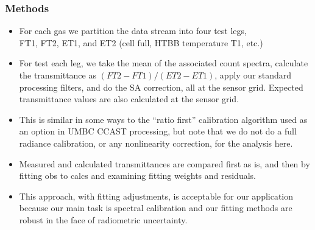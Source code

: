 \documentclass[10pt]{beamer}
\begin{document}
\begin{frame}
\frametitle{Methods}
\begin{itemize}

  \item For each gas we partition the data stream into four test
    legs, \\ FT1, FT2, ET1, and ET2 (cell full, HTBB temperature T1,
    etc.)

  \item For test each leg, we take the mean of the associated count
    spectra, calculate the transmittance as $(FT2 - FT1) / (ET2 -
    ET1)$, apply our standard processing filters, and do the SA
    correction, all at the sensor grid.  Expected transmittance
    values are also calculated at the sensor grid.

  \item This is similar in some ways to the ``ratio first''
    calibration algorithm used as an option in UMBC CCAST
    processing, but note that we do not do a full radiance
    calibration, or any nonlinearity correction, for the analysis
    here.

  \item Measured and calculated transmittances are compared first as
    is, and then by fitting obs to calcs and examining fitting
    weights and residuals.

  \item This approach, with fitting adjustments, is acceptable for
    our application because our main task is spectral calibration
    and our fitting methods are robust in the face of radiometric
    uncertainty.

\end{itemize}
\end{frame}
\end{document}
